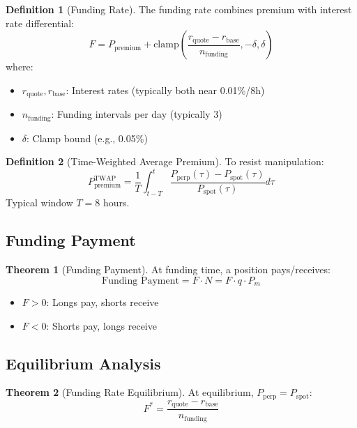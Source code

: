 \documentclass[11pt,a4paper]{article}
\theoremstyle{definition}
\newtheorem{definition}{Definition}
\newtheorem{theorem}{Theorem}
\begin{document}
\begin{definition}[Funding Rate]
The funding rate combines premium with interest rate differential:
\begin{equation}
F = P_{\text{premium}} + \text{clamp}\left(\frac{r_{\text{quote}} - r_{\text{base}}}{n_{\text{funding}}}, -\delta, \delta\right)
\end{equation}
where:
\begin{itemize}
\item $r_{\text{quote}}, r_{\text{base}}$: Interest rates (typically both near 0.01\%/8h)
\item $n_{\text{funding}}$: Funding intervals per day (typically 3)
\item $\delta$: Clamp bound (e.g., 0.05\%)
\end{itemize}
\end{definition}

\begin{definition}[Time-Weighted Average Premium]
To resist manipulation:
\begin{equation}
P_{\text{premium}}^{\text{TWAP}} = \frac{1}{T} \int_{t-T}^{t} \frac{P_{\text{perp}}(\tau) - P_{\text{spot}}(\tau)}{P_{\text{spot}}(\tau)} d\tau
\end{equation}
Typical window $T = 8$ hours.
\end{definition}

\subsection{Funding Payment}

\begin{theorem}[Funding Payment]
At funding time, a position pays/receives:
\begin{equation}
\text{Funding Payment} = F \cdot N = F \cdot q \cdot P_m
\end{equation}
\begin{itemize}
\item $F > 0$: Longs pay, shorts receive
\item $F < 0$: Shorts pay, longs receive
\end{itemize}
\end{theorem}

\subsection{Equilibrium Analysis}

\begin{theorem}[Funding Rate Equilibrium]
At equilibrium, $P_{\text{perp}} = P_{\text{spot}}$:
\begin{equation}
F^* = \frac{r_{\text{quote}} - r_{\text{base}}}{n_{\text{funding}}}
\end{equation}
\end{theorem}
\end{document}
